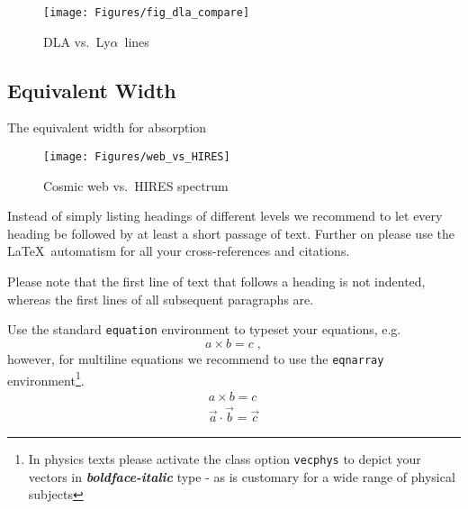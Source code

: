 \documentclass[graybox]{svmult}
\def\lya{Ly$\alpha$}
\begin{document}
%
\begin{figure}[b]
\texttt{[image: Figures/fig\_dla\_compare]}
%
%
\caption{DLA vs.\ \lya\ lines
}
\label{fig:lyalines}       %
\end{figure}

\subsection{Equivalent Width}
\label{subsec:EW}

The equivalent width for absorption 


%
\begin{figure}[b]
\sidecaption
\texttt{[image: Figures/web\_vs\_HIRES]}
%
%
\caption{Cosmic web vs.\ HIRES spectrum
}
\label{fig:web_vs_HIRES}       %
\end{figure}


Instead of simply listing headings of different levels we recommend to
let every heading be followed by at least a short passage of text.
Further on please use the \LaTeX\ automatism for all your
cross-references and citations.

Please note that the first line of text that follows a heading is not indented, whereas the first lines of all subsequent paragraphs are.

Use the standard \verb|equation| environment to typeset your equations, e.g.
%
\begin{equation}
a \times b = c\;,
\end{equation}
%
however, for multiline equations we recommend to use the \verb|eqnarray| environment\footnote{In physics texts please activate the class option \texttt{vecphys} to depict your vectors in \textbf{\itshape boldface-italic} type - as is customary for a wide range of physical subjects}.
\begin{eqnarray}
a \times b = c \nonumber\\
\vec{a} \cdot \vec{b}=\vec{c}
\label{eq:01}
\end{eqnarray}
\end{document}
